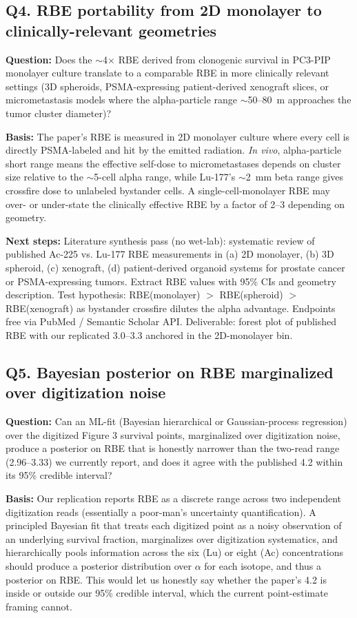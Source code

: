\subsection*{Q4. RBE portability from 2D monolayer to clinically-relevant geometries}
\textbf{Question:} Does the $\sim$4$\times$ RBE derived from clonogenic
survival in PC3-PIP monolayer culture translate to a comparable RBE in more
clinically relevant settings (3D spheroids, PSMA-expressing patient-derived
xenograft slices, or micrometastasis models where the alpha-particle range
$\sim$50--80~\textmu m approaches the tumor cluster diameter)?

\textbf{Basis:} The paper's RBE is measured in 2D monolayer culture where
every cell is directly PSMA-labeled and hit by the emitted radiation.
\emph{In vivo}, alpha-particle short range means the effective self-dose to
micrometastases depends on cluster size relative to the $\sim$5-cell alpha
range, while Lu-177's $\sim$2~mm beta range gives crossfire dose to
unlabeled bystander cells. A single-cell-monolayer RBE may over- or
under-state the clinically effective RBE by a factor of 2--3 depending on
geometry.

\textbf{Next steps:} Literature synthesis pass (no wet-lab): systematic
review of published Ac-225 vs. Lu-177 RBE measurements in (a) 2D monolayer,
(b) 3D spheroid, (c) xenograft, (d) patient-derived organoid systems for
prostate cancer or PSMA-expressing tumors. Extract RBE values with 95\% CIs
and geometry description. Test hypothesis: RBE(monolayer) $>$ RBE(spheroid)
$>$ RBE(xenograft) as bystander crossfire dilutes the alpha advantage.
Endpoints free via PubMed / Semantic Scholar API. Deliverable: forest plot
of published RBE with our replicated 3.0--3.3 anchored in the 2D-monolayer
bin.

\subsection*{Q5. Bayesian posterior on RBE marginalized over digitization noise}
\textbf{Question:} Can an ML-fit (Bayesian hierarchical or Gaussian-process
regression) over the digitized Figure 3 survival points, marginalized over
digitization noise, produce a posterior on RBE that is honestly narrower
than the two-read range (2.96--3.33) we currently report, and does it agree
with the published 4.2 within its 95\% credible interval?

\textbf{Basis:} Our replication reports RBE as a discrete range across two
independent digitization reads (essentially a poor-man's uncertainty
quantification). A principled Bayesian fit that treats each digitized point
as a noisy observation of an underlying survival fraction, marginalizes
over digitization systematics, and hierarchically pools information across
the six (Lu) or eight (Ac) concentrations should produce a posterior
distribution over $\alpha$ for each isotope, and thus a posterior on RBE.
This would let us honestly say whether the paper's 4.2 is inside or outside
our 95\% credible interval, which the current point-estimate framing cannot.

